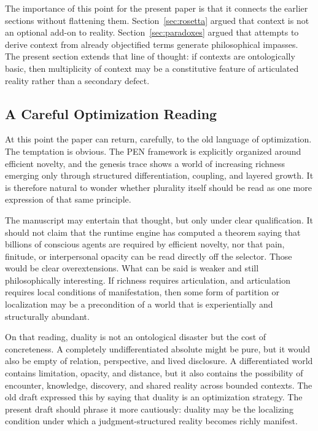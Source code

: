 \documentclass[11pt,a4paper]{article}
\theoremstyle{plain}
\theoremstyle{definition}
\theoremstyle{remark}
\begin{document}
The importance of this point for the present paper is that it connects the earlier sections without flattening them.
Section~\ref{sec:rosetta} argued that context is not an optional add-on to reality.
Section~\ref{sec:paradoxes} argued that attempts to derive context from already objectified terms generate philosophical impasses.
The present section extends that line of thought: if contexts are ontologically basic, then multiplicity of context may be a constitutive feature of articulated reality rather than a secondary defect.

\subsection{A Careful Optimization Reading}
\label{subsec:optimization-reading}

At this point the paper can return, carefully, to the old language of optimization.
The temptation is obvious.
The PEN framework is explicitly organized around efficient novelty, and the genesis trace shows a world of increasing richness emerging only through structured differentiation, coupling, and layered growth.
It is therefore natural to wonder whether plurality itself should be read as one more expression of that same principle.

The manuscript may entertain that thought, but only under clear qualification.
It should not claim that the runtime engine has computed a theorem saying that billions of conscious agents are required by efficient novelty, nor that pain, finitude, or interpersonal opacity can be read directly off the selector.
Those would be clear overextensions.
What can be said is weaker and still philosophically interesting.
If richness requires articulation, and articulation requires local conditions of manifestation, then some form of partition or localization may be a precondition of a world that is experientially and structurally abundant.

On that reading, duality is not an ontological disaster but the cost of concreteness.
A completely undifferentiated absolute might be pure, but it would also be empty of relation, perspective, and lived disclosure.
A differentiated world contains limitation, opacity, and distance, but it also contains the possibility of encounter, knowledge, discovery, and shared reality across bounded contexts.
The old draft expressed this by saying that duality is an optimization strategy.
The present draft should phrase it more cautiously: duality may be the localizing condition under which a judgment-structured reality becomes richly manifest.
\end{document}
